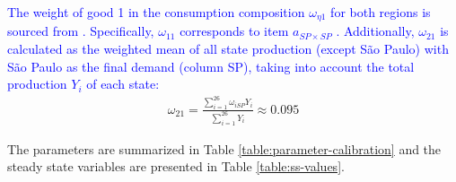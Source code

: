 \documentclass[../thesis.tex]{subfiles}
\begin{document}
\textcolor{blue}{The weight of good 1 in the consumption composition $\omega_{\eta 1}$ for both regions is sourced from \textcite[Table 3, p.442]{haddad_matriz_2017}. Specifically, $\omega_{11}$ corresponds to item $a_{SP\times SP}$ \label{eq:omega-e1}. Additionally, $\omega_{21}$ is calculated as the weighted mean of all state production (except São Paulo) with São Paulo as the final demand (column SP), taking into account the total production $Y_{i}$ of each state:}
\begin{align}
	\omega_{21} = \frac{\sum_{i=1}^{26} \omega_{iSP} Y_i}{\sum_{i=1}^{26} Y_i} \approx 0.095 \label{eq:omega-e2}
\end{align}

The parameters are summarized in Table \eqref{table:parameter-calibration} and the steady state variables are presented in Table \eqref{table:ss-values}.


\newpage



\end{document}
